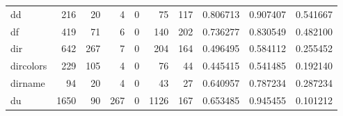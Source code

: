 \begin{longtable}{lrrrrrrrrr}
dd        &                                                216 &                                                 20 &                                                  4 &                                                  0 &                                                 75 &                                                117 &                                           0.806713 &                               0.907407 &                             0.541667 \\
df        &                                                419 &                                                 71 &                                                  6 &                                                  0 &                                                140 &                                                202 &                                           0.736277 &                               0.830549 &                             0.482100 \\
dir       &                                                642 &                                                267 &                                                  7 &                                                  0 &                                                204 &                                                164 &                                           0.496495 &                               0.584112 &                             0.255452 \\
dircolors &                                                229 &                                                105 &                                                  4 &                                                  0 &                                                 76 &                                                 44 &                                           0.445415 &                               0.541485 &                             0.192140 \\
dirname   &                                                 94 &                                                 20 &                                                  4 &                                                  0 &                                                 43 &                                                 27 &                                           0.640957 &                               0.787234 &                             0.287234 \\
du        &                                               1650 &                                                 90 &                                                267 &                                                  0 &                                               1126 &                                                167 &                                           0.653485 &                               0.945455 &                             0.101212 \\

\end{longtable}
